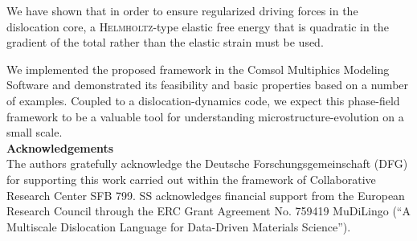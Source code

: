 \documentclass[preprint,review,3p,times,authoryear]{elsarticle}
\begin{document}
We have shown that in order to ensure regularized driving forces in the dislocation core, a \textsc{Helmholtz}-type elastic free energy that is quadratic in the gradient of the total rather than the elastic strain must be used.

We implemented the proposed framework in the Comsol Multiphics Modeling Software and demonstrated its feasibility and basic properties based on a number of examples.
%
Coupled to a dislocation-dynamics code, we expect this phase-field framework to be a valuable tool for understanding microstructure-evolution on a small scale.\\



\textbf{Acknowledgements}\\
The authors gratefully acknowledge the Deutsche Forschungsgemeinschaft (DFG) for supporting this work carried out within the framework of Collaborative Research Center SFB 799. SS acknowledges financial support from the European Research Council through the ERC Grant Agreement No. 759419 MuDiLingo (“A Multiscale Dislocation Language for Data-Driven Materials Science”).


\appendix
\end{document}
